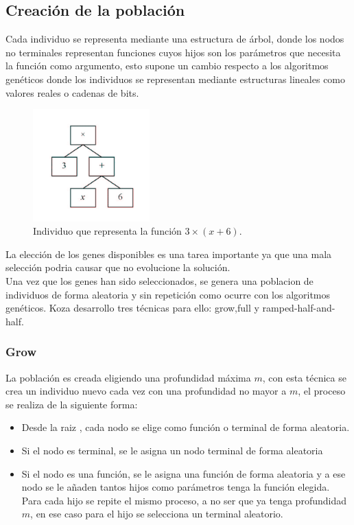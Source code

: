 \documentclass[12pt]{article} \usepackage[utf8x]{inputenc}
\begin{document}
\subsection {Creación de la población}

Cada individuo se representa mediante una estructura de árbol, donde los nodos no terminales representan funciones cuyos hijos son los parámetros que necesita la función como argumento, esto supone un cambio respecto a los algoritmos genéticos donde los individuos se representan mediante estructuras lineales como valores reales o cadenas de bits.

\begin{figure}[H]
    \centering
    \includegraphics[width=0.4\textwidth]{individuo.PNG}
    \caption{Individuo que representa la función \(3\times(x+6)\).}
    \label{fig:dfd:1}
\end{figure}

La elección de los genes disponibles es una tarea importante ya que una mala selección podria causar que no evolucione la solución.\\

Una vez que los genes han sido seleccionados, se genera una poblacion de individuos de forma aleatoria y sin repetición como ocurre con los algoritmos genéticos. Koza desarrollo tres técnicas para ello: grow,full y ramped-half-and-half.

\subsubsection{Grow}

La población es creada eligiendo una profundidad máxima \(m\), con esta técnica se crea un individuo nuevo cada vez con una profundidad no mayor a \(m\), el proceso se realiza de la siguiente forma:
\begin{itemize}
\item  Desde la raiz , cada nodo se elige como función o terminal de forma aleatoria.
\item  Si el nodo es terminal, se le asigna un nodo terminal de forma aleatoria
\item  Si el nodo es una función, se le asigna una función de forma aleatoria y a ese nodo se le añaden tantos hijos como parámetros tenga la función elegida. Para cada hijo se repite el mismo proceso, a no ser que ya tenga profundidad \(m\), en ese caso para el hijo se selecciona un terminal aleatorio.
\end{itemize}
\end{document}
